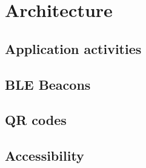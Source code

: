 \section{Architecture}
\label{sec:architecture}

\subsection{Application activities}


\subsection{BLE Beacons}


\subsection{QR codes}


\subsection{Accessibility}

